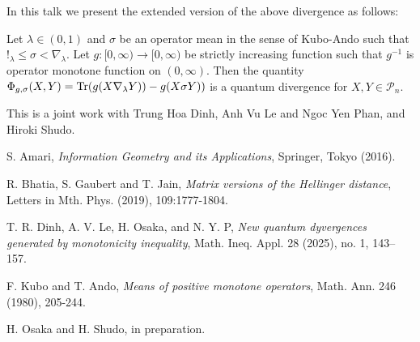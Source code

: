 \documentclass[ILAS2025-program.tex]{subfiles}
\begin{document}
\begin{ilasabstract}
\begin{bibunit}
\vskip 2mm

In this talk we present the extended version of the above divergence as follows:

Let $\lambda \in (0, 1)$ and $\sigma$ be an operator mean in the sense of Kubo-Ando \cite{KA 1980} such that $!_\lambda \leq \sigma < \nabla_\lambda$. Let $g:[0,\infty) \rightarrow [0,\infty)$ be strictly increasing function such that $g^{-1}$ is operator monotone function on $(0, \infty)$. Then the quantity $\Phi_{g,\sigma}(X,Y) = {\rm Tr}(g(X\nabla_\lambda Y))-g(X\sigma Y))$ is a quantum divergence for $X,Y \in \mathcal{P}_n$.

This is a joint work with Trung Hoa Dinh, Anh Vu Le and Ngoc Yen Phan, and Hiroki Shudo.

\begin{thebibliography}{99}

 S. Amari, 
\textit{Information Geometry and its Applications}, Springer, Tokyo (2016).


 R. Bhatia, S. Gaubert and T. Jain,
\textit{Matrix versions of the Hellinger distance}, Letters in Mth. Phys. (2019), 109:1777-1804.

 T. R. Dinh, A. V. Le, H. Osaka, and N. Y. P,
\textit{New quantum dyvergences generated by monotonicity inequality},
Math. Ineq. Appl. 28 (2025), no. 1, 143–157.

 F. Kubo and T. Ando,
\textit{Means of positive monotone operators}, Math. Ann. 246 (1980), 205-244.

 H. Osaka and H. Shudo, in preparation.

\end{thebibliography}
        \end{bibunit}
        
\end{ilasabstract}
    
\end{document}

